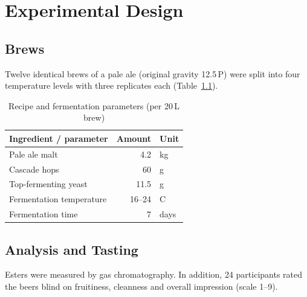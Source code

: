\chapter{Experimental Design}
\label{cha:design}

\section{Brews}
Twelve identical brews of a pale ale (original gravity 12.5\,\textdegree{}P) were split into four
temperature levels with three replicates each (Table~\ref{tab:recipe}).

\begin{table}[htbp]
  \centering
  \caption{Recipe and fermentation parameters (per 20\,L brew)}
  \label{tab:recipe}
  \begin{tabular}{lrl}
    \toprule
    Ingredient / parameter & Amount & Unit \\
    \midrule
    Pale ale malt          & 4.2      & kg \\
    Cascade hops           & 60       & g \\
    Top-fermenting yeast   & 11.5     & g \\
    Fermentation temperature & 16--24 & \textdegree{}C \\
    Fermentation time      & 7        & days \\
    \bottomrule
  \end{tabular}
\end{table}

\section{Analysis and Tasting}
Esters were measured by gas chromatography. In addition, 24 participants rated the beers blind on
fruitiness, cleanness and overall impression (scale 1--9).
